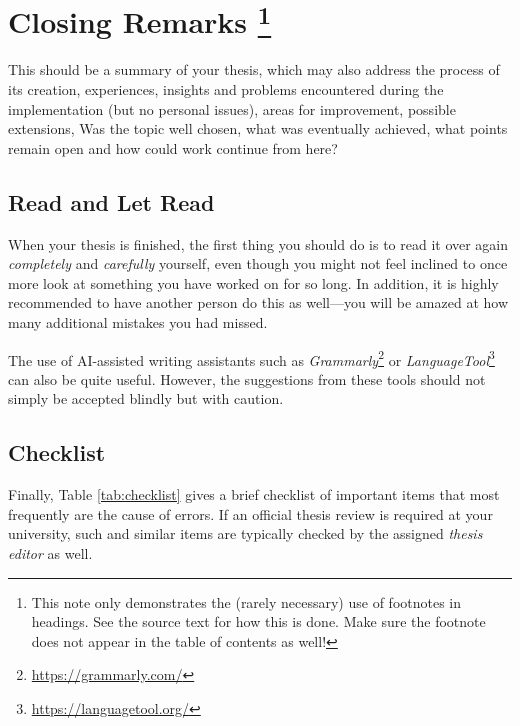 \chapter[Closing Remarks]{Closing Remarks%
\protect\footnote{This note only demonstrates the (rarely necessary)
use of footnotes in headings. See the source text for how this is done.
Make sure the footnote does not appear in the table of contents as well!}}%
\label{cha:Closing}

This should be a summary of your thesis, which may also address the
process of its creation, experiences, insights and problems encountered during
the implementation (but no personal issues), areas for improvement, possible
extensions, \etc
Was the topic well chosen, what was eventually achieved,
what points remain open and how could work continue from here?


\section{Read and Let Read}

When your thesis is finished, the first thing you should do is to read it
over again \emph{completely} and \emph{carefully} yourself, even though you
might not feel inclined to once more look at something you have worked on for
so long. In addition, it is highly recommended to have another person do this
as well---you will be amazed at how many additional mistakes you had missed.

The use of AI-assisted writing assistants such as
\emph{Grammarly}\footnote{\url{https://grammarly.com/}} or
\emph{LanguageTool}\footnote{\url{https://languagetool.org/}}
can also be quite useful. However, the suggestions from these tools should not
simply be accepted blindly but with caution.


\section{Checklist}

Finally, Table \ref{tab:checklist} gives a brief checklist of important items
that most frequently are the cause of errors. If an official thesis review is 
required at your university, such and similar items are typically checked 
by the assigned \emph{thesis editor} as well.

